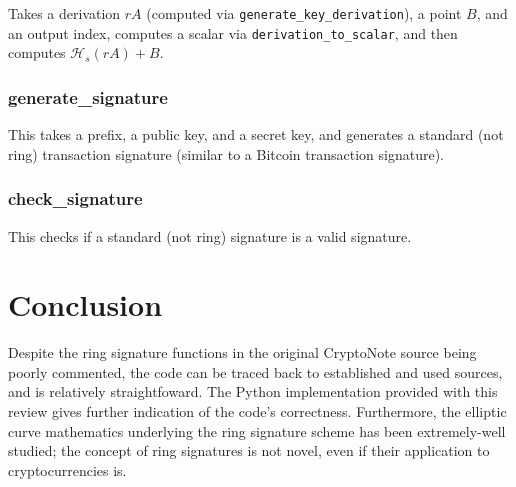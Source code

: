 \documentclass[12pt,english]{mrl}
\numberwithin{equation}{section}
\numberwithin{figure}{section}
\begin{document}
Takes a derivation $rA$ (computed via \texttt{generate\_key\_derivation}),
a point $B$, and an output index, computes a scalar via \texttt{derivation\_to\_scalar},
and then computes $\mathcal{H}_{s}\left(rA\right)+B$. 


\subsubsection{generate\_signature}

This takes a prefix, a public key, and a secret key, and generates
a standard (not ring) transaction signature (similar to a Bitcoin
transaction signature). 


\subsubsection{check\_signature}

This checks if a standard (not ring) signature is a valid signature. 

\section{Conclusion}
Despite the ring signature functions in the original CryptoNote source being poorly commented, the code can be traced back to established and used sources, and is relatively straightfoward. The Python implementation provided with this review gives further indication of the code's correctness. Furthermore, the elliptic curve mathematics underlying the ring signature scheme has been extremely-well studied; the concept of ring signatures is not novel, even if their application to cryptocurrencies is.

\medskip{}
\end{document}
